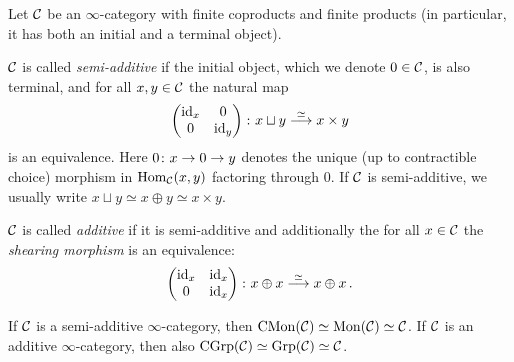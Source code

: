 \begin{defi}\label{def:Additive}
	Let $\mathcal{C}$ be an $\infty$-category  with finite coproducts and finite products (in particular, it has both an initial and a terminal object).
	\begin{alphanumerate}
		\item $\mathcal{C}$ is called \emph{semi-additive} if the initial object, which we denote $0\in\mathcal{C}$, is also terminal, and for all $x,y\in \mathcal{C}$ the natural map\label{enum:SemiAdditive}
		\begin{equation*}
			\begin{pmatrix}
				\operatorname{id}_x & 0\\
				0 & \operatorname{id}_y
			\end{pmatrix}\colon x\sqcup y\overset{\simeq}{\longrightarrow} x\times y
		\end{equation*}
		is an equivalence. Here $0\colon x\morphism 0\morphism y$ denotes the unique (up to contractible choice) morphism in $\operatorname{Hom}_{\mathcal{C}}(x,y)$ factoring through $0$. If $\mathcal{C}$ is semi-additive, we usually write $x\sqcup y\simeq x\oplus y\simeq x\times y$.
		\item $\mathcal{C}$ is called \emph{additive} if it is semi-additive and additionally the for all $x\in \mathcal{C}$ the \emph{shearing morphism} is an equivalence:\label{enum:Additive}
		\begin{equation*}
			\begin{pmatrix}
				\operatorname{id}_x & \operatorname{id}_x\\
				0 & \operatorname{id}_x
			\end{pmatrix}\colon x\oplus x\overset{\simeq}{\longrightarrow} x\oplus x\,.
		\end{equation*}	
	\end{alphanumerate}
\end{defi}
\begin{lem}\label{lem:CGrpIsC}
	If $\mathcal{C}$ is a semi-additive $\infty$-category, then $\mathrm{CMon}(\mathcal{C})\simeq \mathrm{Mon}(\mathcal{C})\simeq \mathcal{C}$. If $\mathcal{C}$ is an additive $\infty$-category, then also $\mathrm{CGrp}(\mathcal{C})\simeq \mathrm{Grp}(\mathcal{C})\simeq \mathcal{C}$.
\end{lem}
